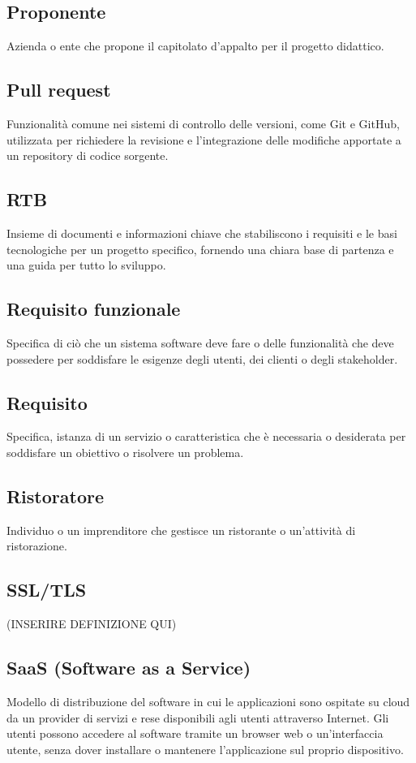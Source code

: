 \subsection{Proponente}Azienda o ente che propone il capitolato d’appalto per il progetto didattico.
\subsection{Pull request}Funzionalità comune nei sistemi di controllo delle versioni, come Git e GitHub, utilizzata per richiedere la revisione e l'integrazione delle modifiche apportate a un repository di codice sorgente.
\subsection{RTB}Insieme di documenti e informazioni chiave che stabiliscono i requisiti e le basi tecnologiche per un progetto specifico, fornendo una chiara base di partenza e una guida per tutto lo sviluppo.
\subsection{Requisito funzionale}Specifica di ciò che un sistema software deve fare o delle funzionalità che deve possedere per soddisfare le esigenze degli utenti, dei clienti o degli stakeholder.
\subsection{Requisito}Specifica, istanza di un servizio o caratteristica che è necessaria o desiderata per soddisfare un obiettivo o risolvere un problema.
\subsection{Ristoratore}Individuo o un imprenditore che gestisce un ristorante o un'attività di ristorazione.
\subsection{SSL/TLS} (INSERIRE DEFINIZIONE QUI)
\subsection{SaaS (Software as a Service)}Modello di distribuzione del software in cui le applicazioni sono ospitate su cloud da un provider di servizi e rese disponibili agli utenti attraverso Internet. Gli utenti possono accedere al software tramite un browser web o un'interfaccia utente, senza dover installare o mantenere l'applicazione sul proprio dispositivo.
